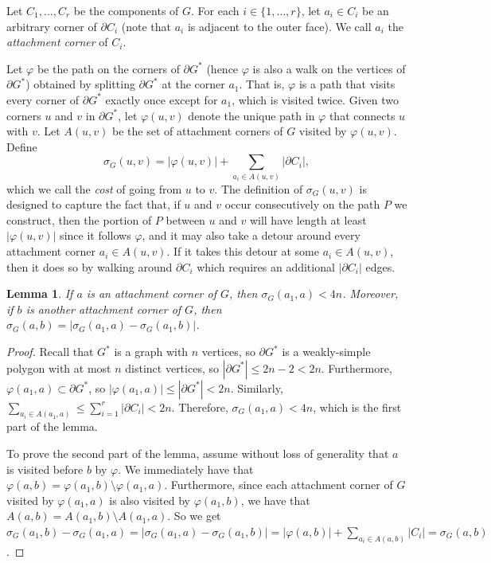 \documentclass[11pt]{patmorin}
\newtheorem{lemma}[theorem]{Lemma}
\begin{document}
Let $C_1, \ldots, C_r$ be the components of $G$.
For each $i\in \{1,\dots,r\}$, let $a_i\in C_i$ be an arbitrary corner of $\partial C_i$ (note that $a_i$ is adjacent to the outer face).
We call $a_i$ the \emph{attachment corner} of $C_i$.

Let $\varphi$ be the path on the corners of $\partial G^*$ (hence $\varphi$ is also a walk on the vertices of $\partial G^*$) obtained by splitting $\partial G^*$ at the corner $a_1$. That is, $\varphi$ is a path that visits every corner of $\partial G^*$ exactly once except for $a_1$, which is visited twice.
Given two corners $u$ and $v$ in $\partial G^*$, let $\varphi(u,v)$ denote
the unique path in $\varphi$ that connects $u$ with $v$. Let $A(u,v)$ be
the set of attachment corners of $G$ visited by $\varphi(u,v)$. Define
    $$ \sigma_G(u,v) = |\varphi(u,v)| + \sum_{a_i\in A(u,v)}|\partial C_i|,$$
which we call the \emph{cost} of going from $u$ to $v$.  The definition of $\sigma_G(u,v)$ is designed to capture the fact that, if $u$ and $v$ occur consecutively on the path $P$ we construct, then the portion of $P$ between $u$ and $v$ will have length at least $|\varphi(u,v)|$ since it follows $\varphi$, and it may also take a detour around every attachment corner $a_i\in A(u,v)$.  If it takes this detour at some $a_i\in A(u,v)$, then it does so by walking around $\partial C_i$ which requires an additional $|\partial C_i|$ edges.




\begin{lemma}\label{lemma:Contained in integer grid}
    If $a$ is an attachment corner of $G$, then $\sigma_G(a_1, a) < 4n$. Moreover, if $b$ is another attachment corner of $G$, then
  $\sigma_G(a, b) =  |\sigma_G(a_1, a)- \sigma_G(a_1, b)|$.
\end{lemma}
\begin{proof}
Recall that $G^*$ is a graph with $n$ vertices, so $\partial G^*$ is a weakly-simple polygon with at most $n$ distinct vertices, so $|\partial G^*|\le 2n-2<2n$.
Furthermore, $\varphi(a_1,a)\subset \partial G^*$, so
$|\varphi(a_1,a)|\le |\partial G^*|< 2n$.  Similarly, $\sum_{a_i\in A(a_1,a)} \le \sum_{i=1}^r |\partial C_i| < 2n$.
Therefore, $\sigma_G(a_1,a)< 4n$, which is the first part of the lemma.

To prove the second part of the lemma, 
assume without loss of generality that $a$ is visited before $b$ by $\varphi$.
We immediately have that $\varphi(a,b)=\varphi(a_1,b)\setminus\varphi(a_1,a)$.
Furthermore, since each attachment corner of $G$ visited by $\varphi(a_1, a)$ is also visited by $\varphi(a_1, b)$, we have that $A(a,b)=A(a_1,b)\setminus A(a_1,a)$.  So we get
$\sigma_G(a_1, b)- \sigma_G(a_1, a) = |\sigma_G(a_1, a) - \sigma_G(a_1, b)| = |\varphi(a, b)|  + \sum_{a_i\in A(a, b)} |C_i| = \sigma_G(a, b)$.
\end{proof}
\end{document}
